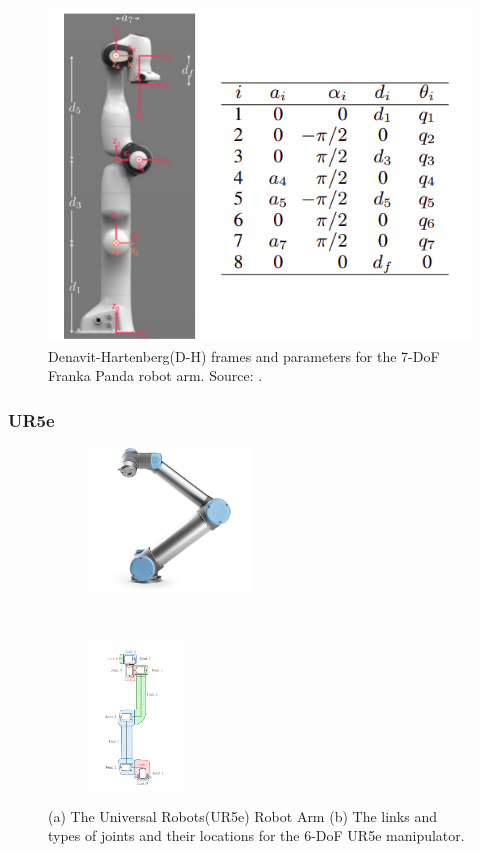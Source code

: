 \begin{figure}[ht]
    \centering
    \includegraphics[scale=0.5]{figures/background/dh-franka.png}
    \caption[DH Parameters for the Franka Panda Arm]{Denavit-Hartenberg(D-H) frames and parameters for the 7-DoF Franka Panda robot arm. Source: \cite{DH-Franka}.}
    \label{fig:dh-franka}
\end{figure}

\subsubsection{UR5e}

\begin{figure}[t!]
    \centering
    \begin{subfigure}[t]{0.4\textwidth}
        \centering
        \includegraphics[height=1.5in]{figures/background/ur5e_overview.png}
    \end{subfigure}%
    ~ 
    \begin{subfigure}[t]{0.5\textwidth}
        \centering
        \includegraphics[height=1.5in]{figures/background/ur5e_links.png}
    \end{subfigure}
    \caption[Universal Robots(UR5e) Robot Arm]{(a) The Universal Robots(UR5e) Robot Arm (b) The links and types of joints and their locations for the 6-DoF UR5e manipulator.}
    \label{fig:ur5e}
\end{figure}

